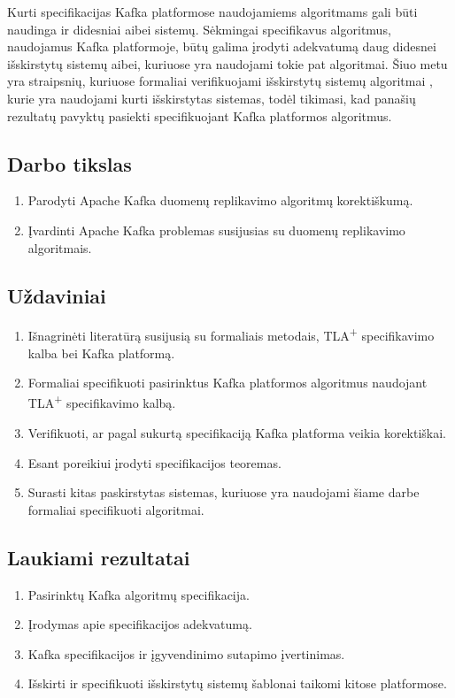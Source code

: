 \documentclass{VUMIFPSmagistrinis}
\begin{document}
		
		Kurti specifikacijas Kafka platformose naudojamiems algoritmams gali būti naudinga ir didesniai aibei sistemų. 
		Sėkmingai specifikavus algoritmus, naudojamus Kafka platformoje, būtų galima įrodyti adekvatumą daug didesnei išskirstytų sistemų aibei, kuriuose yra naudojami tokie pat algoritmai. 
		Šiuo metu yra straipsnių, kuriuose formaliai verifikuojami išskirstytų sistemų algoritmai \cite{lamport2005generalized}, kurie yra naudojami kurti išskirstytas sistemas, todėl tikimasi, kad panašių rezultatų pavyktų pasiekti specifikuojant Kafka platformos algoritmus.
	
	\subsection*{Darbo tikslas}
		\begin{enumerate}
			\item{Parodyti Apache Kafka duomenų replikavimo algoritmų korektiškumą.}
			\item{Įvardinti Apache Kafka problemas susijusias su duomenų replikavimo algoritmais.}
		\end{enumerate}	

	
	\subsection*{Uždaviniai}
		\begin{enumerate}
			\item{Išnagrinėti literatūrą susijusią su formaliais metodais, TLA\textsuperscript{+} specifikavimo kalba bei Kafka platformą.}
			\item{Formaliai specifikuoti pasirinktus Kafka platformos algoritmus naudojant TLA\textsuperscript{+} specifikavimo kalbą.}
			\item{Verifikuoti, ar pagal sukurtą specifikaciją Kafka platforma veikia korektiškai.}
			\item{Esant poreikiui įrodyti specifikacijos teoremas.}
			\item{Surasti kitas paskirstytas sistemas, kuriuose yra naudojami šiame darbe formaliai specifikuoti algoritmai.}
		\end{enumerate}
	
	\subsection*{Laukiami rezultatai}
		\begin{enumerate}
			\item{Pasirinktų Kafka algoritmų specifikacija.}
			\item{Įrodymas apie specifikacijos adekvatumą.}
			\item{Kafka
 specifikacijos ir įgyvendinimo sutapimo įvertinimas.}
			\item{Išskirti ir specifikuoti išskirstytų sistemų šablonai taikomi kitose platformose.}
		\end{enumerate}
	
	\printbibliography[heading=bibintoc] 
\end{document}
